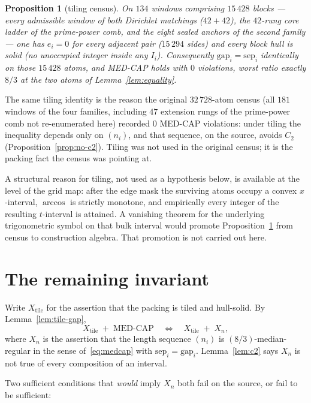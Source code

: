 \documentclass[11pt]{article}
\newtheorem{prop}{Proposition}
\theoremstyle{remark}
\begin{document}
\begin{prop}[tiling census]\label{prop:tiling-census}
On $134$ windows comprising $15\,428$ blocks --- every admissible
window of both Dirichlet matchings ($42+42$), the $42$-rung core
ladder of the prime-power comb, and the eight sealed anchors of
the second family --- one has $e_i=0$ for every adjacent pair
($15\,294$ sides) and every block hull is solid (no unoccupied
integer inside any $I_i$).  Consequently $\mathrm{gap}_i=\mathrm{sep}_i$
identically on those $15\,428$ atoms, and MED-CAP holds with
$0$ violations, worst ratio exactly $8/3$ at the two atoms of
Lemma~\ref{lem:equality}.
\end{prop}

The same tiling identity is the reason the original $32\,728$-atom
census (all $181$ windows of the four families, including $47$
extension rungs of the prime-power comb not re-enumerated here)
recorded $0$ MED-CAP violations: under tiling the inequality
depends only on $(n_i)$, and that sequence, on the source, avoids
$C_2$ (Proposition~\ref{prop:no-c2}).  Tiling was not used in the
original census; it is the packing fact the census was pointing
at.

A structural reason for tiling, not used as a hypothesis below, is
available at the level of the grid map: after the edge mask the
surviving atoms occupy a convex $x$-interval, $\arccos$ is strictly
monotone, and empirically every integer of the resulting $t$-interval
is attained.  A vanishing theorem for the underlying trigonometric
symbol on that bulk interval would promote
Proposition~\ref{prop:tiling-census} from census to construction
algebra.  That promotion is not carried out here.

\section{The remaining invariant}\label{sec:obstruction}

Write $X_{\mathrm{tile}}$ for the assertion that the packing is
tiled and hull-solid.  By Lemma~\ref{lem:tile-gap},
\[
X_{\mathrm{tile}}\;+\;\text{MED-CAP}
\quad\Longleftrightarrow\quad
X_{\mathrm{tile}}\;+\;X_n,
\]
where $X_n$ is the assertion that the length sequence $(n_i)$ is
$(8/3)$-median-regular in the sense of~\eqref{eq:medcap} with
$\mathrm{sep}_i=\mathrm{gap}_i$.  Lemma~\ref{lem:c2} says $X_n$ is
not true of every composition of an interval.

Two sufficient conditions that \emph{would} imply $X_n$ both fail
on the source, or fail to be sufficient:
\end{document}
